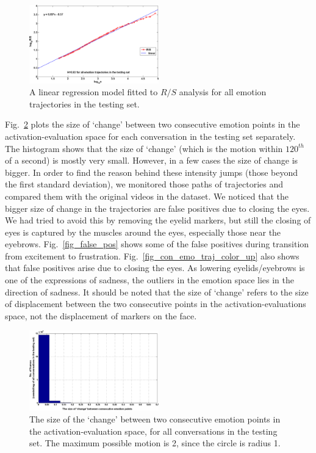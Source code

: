 \documentclass[10pt,journal,cspaper,compsoc]{IEEEtran}
\begin{document}
\begin{figure}[!htp]
\centering
\includegraphics[width=0.5\textwidth]{figures/Ch7/hurst_slope.png}
\caption{A linear regression model fitted to $R/S$ analysis for all emotion trajectories in the testing set.}
\label{fig_hurst_slope}
\end{figure}

Fig.~\ref{fig_sum_hist} plots the size of `change' between two consecutive emotion points in the activation-evaluation space for each conversation in the testing set separately. The histogram shows that the size of `change' (which is the motion within $120^{th}$ of a second) is mostly very small. However, in a few cases the size of change is bigger. In order to find the reason behind these intensity jumps (those beyond the first standard deviation), we monitored those paths of trajectories and compared them with the original videos in the dataset. We noticed that the bigger size of change in the trajectories are  false positives due to closing the eyes. We had tried to avoid this by removing the eyelid markers, but still the closing of eyes is captured by the muscles around the eyes, especially those near the eyebrows. Fig.~\ref{fig_false_pos} shows some of the false positives during transition from excitement to frustration. Fig.~\ref{fig_con_emo_traj_color_up} also shows that false positives arise due to closing the eyes. As lowering eyelids/eyebrows is one of the expressions of sadness, the outliers in the emotion space lies in the direction of sadness. It should be noted that the size of `change' refers to the size of displacement between the two consecutive points in the activation-evaluations space, not the displacement of markers on the face.

\begin{figure}[!tp]
\centering
\includegraphics[width=0.5\textwidth]{figures/Ch7/sum_hist.png}
\caption{The size of the `change' between two consecutive emotion points in the activation-evaluation space, for all conversations in the testing set. The maximum possible motion is 2, since the circle is radius 1.}
\label{fig_sum_hist}
\end{figure}
\end{document}
